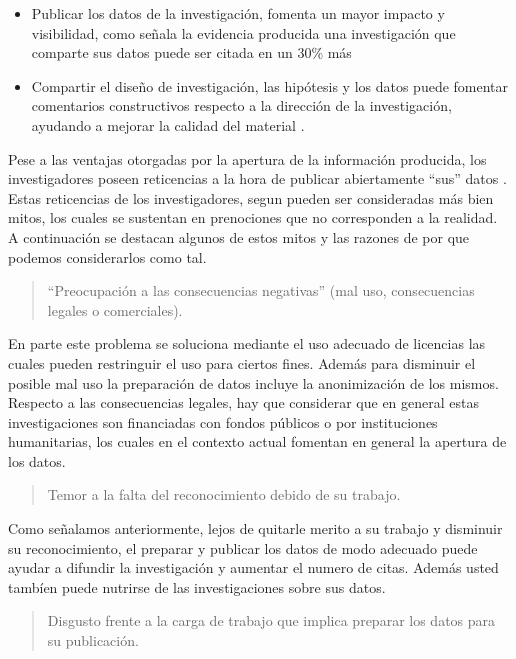 \documentclass[
  14pt,
]{book}
\begin{document}
\begin{itemize}
  \begin{itemize}
  \item
    Publicar los datos de la investigación, fomenta un mayor impacto y visibilidad, como señala la evidencia producida \citet{piwowar_Data_2013} una investigación que comparte sus datos puede ser citada en un 30\% más
  \item
    Compartir el diseño de investigación, las hipótesis y los datos puede fomentar comentarios constructivos respecto a la dirección de la investigación, ayudando a mejorar la calidad del material \citep{sharan_Ten_2020}.
  \end{itemize}
\end{itemize}

Pese a las ventajas otorgadas por la apertura de la información producida, los investigadores poseen reticencias a la hora de publicar abiertamente ``sus'' datos \citep{ferguson_How_2014}. Estas reticencias de los investigadores, segun \citet{sharan_Ten_2020} pueden ser consideradas más bien mitos, los cuales se sustentan en prenociones que no corresponden a la realidad. A continuación se destacan algunos de estos mitos y las razones de por que podemos considerarlos como tal.

\begin{quote}
``Preocupación a las consecuencias negativas'' (mal uso, consecuencias legales o comerciales).
\end{quote}

En parte este problema se soluciona mediante el uso adecuado de licencias las cuales pueden restringuir el uso para ciertos fines. Además para disminuir el posible mal uso la preparación de datos incluye la anonimización de los mismos. Respecto a las consecuencias legales, hay que considerar que en general estas investigaciones son financiadas con fondos públicos o por instituciones humanitarias, los cuales en el contexto actual fomentan en general la apertura de los datos.

\begin{quote}
Temor a la falta del reconocimiento debido de su trabajo.
\end{quote}

Como señalamos anteriormente, lejos de quitarle merito a su trabajo y disminuir su reconocimiento, el preparar y publicar los datos de modo adecuado puede ayudar a difundir la investigación y aumentar el numero de citas. Además usted tambíen puede nutrirse de las investigaciones sobre sus datos.

\begin{quote}
Disgusto frente a la carga de trabajo que implica preparar los datos para su publicación.
\end{quote}
\end{document}

